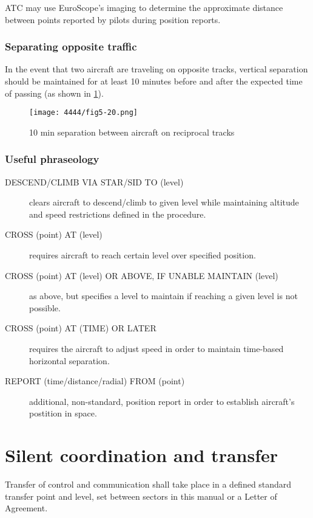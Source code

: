 ATC may use EuroScope's imaging to determine the approximate distance between
points reported by pilots during position reports.

\subsubsection{Separating opposite traffic}

In the event that two aircraft are traveling on opposite tracks, vertical
separation should be maintained for at least 10 minutes before and after the
expected time of passing (as shown in \cref{fig:separation:opposite}).

\begin{figure}[htbp]
  \centering
  \texttt{[image: 4444/fig5-20.png]}
  \caption{10 min separation between aircraft on reciprocal tracks~\cite{4444}}
  \label{fig:separation:opposite}
\end{figure}

\subsubsection{Useful phraseology}

\begin{description}
\item[DESCEND/CLIMB VIA STAR/SID TO (level)] clears aircraft to descend/climb to
  given level while maintaining altitude and speed restrictions defined in the
  procedure.
\item[CROSS (point) AT (level)] requires aircraft to reach certain level over
  specified position.
\item[CROSS (point) AT (level) OR ABOVE, IF UNABLE MAINTAIN (level)] as above,
  but specifies a level to maintain if reaching a given level is not possible.
\item[CROSS (point) AT (TIME) OR LATER] requires the aircraft to adjust speed in
  order to maintain time-based horizontal separation.
\item[REPORT (time/distance/radial) FROM (point)] additional, non-standard,
  position report in order to establish aircraft's postition in space.
\end{description}

\section{Silent coordination and transfer}
\label{sec:app:silentcoor}

Transfer of control and communication shall take place in a defined standard
transfer point and level, set between sectors in this manual or a Letter of
Agreement.

